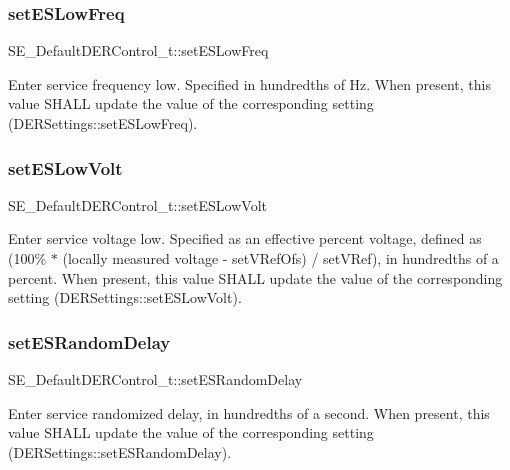 \subsubsection{\texorpdfstring{set\+E\+S\+Low\+Freq}{setESLowFreq}}
{\footnotesize\ttfamily S\+E\+\_\+\+Default\+D\+E\+R\+Control\+\_\+t\+::set\+E\+S\+Low\+Freq}

Enter service frequency low. Specified in hundredths of Hz. When present, this value S\+H\+A\+LL update the value of the corresponding setting (D\+E\+R\+Settings\+::set\+E\+S\+Low\+Freq). \mbox{\label{group__DefaultDERControl_ga105454967aecd8e505c6456389d63e3e}} 
\subsubsection{\texorpdfstring{set\+E\+S\+Low\+Volt}{setESLowVolt}}
{\footnotesize\ttfamily S\+E\+\_\+\+Default\+D\+E\+R\+Control\+\_\+t\+::set\+E\+S\+Low\+Volt}

Enter service voltage low. Specified as an effective percent voltage, defined as (100\% $\ast$ (locally measured voltage -\/ set\+V\+Ref\+Ofs) / set\+V\+Ref), in hundredths of a percent. When present, this value S\+H\+A\+LL update the value of the corresponding setting (D\+E\+R\+Settings\+::set\+E\+S\+Low\+Volt). \mbox{\label{group__DefaultDERControl_gad9d93853acbfe271a02fe438eff09313}} 
\subsubsection{\texorpdfstring{set\+E\+S\+Random\+Delay}{setESRandomDelay}}
{\footnotesize\ttfamily S\+E\+\_\+\+Default\+D\+E\+R\+Control\+\_\+t\+::set\+E\+S\+Random\+Delay}

Enter service randomized delay, in hundredths of a second. When present, this value S\+H\+A\+LL update the value of the corresponding setting (D\+E\+R\+Settings\+::set\+E\+S\+Random\+Delay). \mbox{\label{group__DefaultDERControl_ga89a34e3b5eeda3880b30f0c4136257ad}} 
